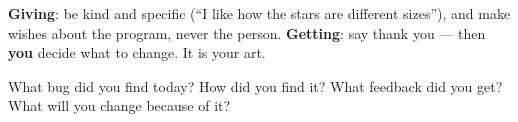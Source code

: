 \begin{tip}
\textbf{Giving}: be kind and specific (\enquote{I like how the stars are different sizes}), and make wishes about the program, never the person. \textbf{Getting}: say thank you --- then \textbf{you} decide what to change. It is your art.
\end{tip}

\begin{vocab}
\end{vocab}

\begin{reflection}
What bug did you find today? How did you find it?
What feedback did you get? What will you change because of it?
\end{reflection}
